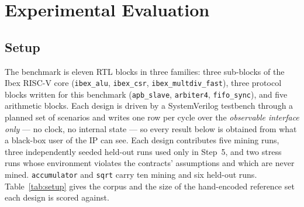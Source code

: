 %
%
%

\section{Experimental Evaluation}
\label{sec:results}

\subsection{Setup}
\label{sec:setup}
The benchmark is eleven RTL blocks in three families: three sub-blocks of the Ibex RISC-V
core (\texttt{ibex\_alu}, \texttt{ibex\_csr}, \texttt{ibex\_multdiv\_fast}), three protocol
blocks written for this benchmark (\texttt{apb\_slave}, \texttt{arbiter4},
\texttt{fifo\_sync}), and five arithmetic blocks. Each design is driven by a SystemVerilog
testbench through a planned set of scenarios and writes one row per cycle over the
\emph{observable interface only} --- no clock, no internal state --- so every result below is
obtained from what a black-box user of the IP can see. Each design contributes five mining
runs, three independently seeded held-out runs used only in Step~5, and two stress runs whose
environment violates the contracts' assumptions and which are never mined.
\texttt{accumulator} and \texttt{sqrt} carry ten mining and six held-out runs. Table~\ref{tab:setup}
gives the corpus and the size of the hand-encoded reference set each design is scored against.

